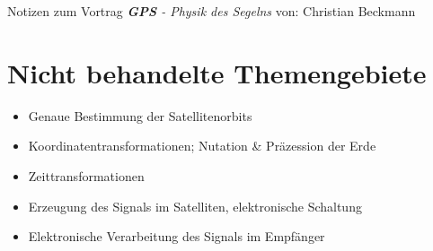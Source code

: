 
\newcommand{\ch}{$\checkmark$}

    {\huge Notizen zum Vortrag \textit{\textbf{GPS} - Physik des Segelns}}
    von: Christian Beckmann
    \tableofcontents
    \nocite{*}
    \printbibliography
    \newpage
    
    
    
    
    
    
    
    

    \section{Nicht behandelte Themengebiete}
    \begin{itemize}
        \item Genaue Bestimmung der Satellitenorbits
        \item Koordinatentransformationen; Nutation \& Präzession der Erde
        \item Zeittransformationen
        \item Erzeugung des Signals im Satelliten, elektronische Schaltung
        \item Elektronische Verarbeitung des Signals im Empfänger

    \end{itemize}

